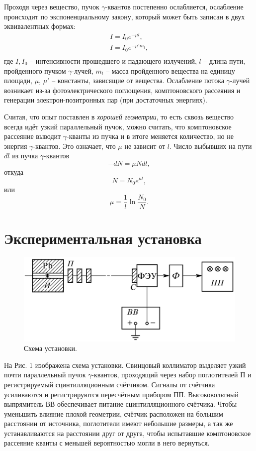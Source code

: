 \documentclass[a4paper,12pt]{article} %
\begin{document}
		Проходя через вещество, пучок $\gamma$-квантов постепенно ослабляется, ослабление происходит по экспоненциальному закону, который может быть записан в двух эквивалентных формах:
		\[\begin{array}{l}
			I = I_0 e^{-\mu l} ,\\
			I = I_0 e^{-\mu' m_l},\\
		\end{array}\]
		где $I, I_0$ -- интенсивности прошедшего и падающего излучений, $l$ -- длина пути, пройденного пучком $\gamma$-лучей, $m_l$ -- масса пройденного вещества на единицу площади, $\mu$, $\mu'$ -- константы, зависящие от вещества. 
		Ослабление потока $\gamma$-лучей возникает из-за фотоэлектрического поглощения, комптоновского рассеяния и генерации электрон-позитронных пар (при достаточных энергиях).\par
		Считая, что опыт поставлен в \textit{хорошей геометрии}, то есть сквозь вещество всегда идёт узкий параллельный пучок, можно считать, что комптоновское рассеяние выводит $\gamma$-кванты из пучка и в итоге меняется количество, но не энергия $\gamma$-квантов. 
		Это означает, что $\mu$ не зависит от $l$. 
		Число выбывших на пути $dl$ из пучка $\gamma$-квантов
		\[-dN = \mu N dl,\]
		откуда
		\[N = N_0 e^{\mu l},\]
		или
		\begin{equation}
			\mu = \dfrac{1}{l} \ln \dfrac{N_0}{N}.
		\end{equation}
	\newpage

	\section{Экспериментальная установка}

		\begin{figure}[h]
			\includegraphics[scale=0.5]{img/1.png}
			\centering
			\caption{Схема установки.}
		\end{figure}
		На Рис. 1 изображена схема установки.
		Свинцовый коллиматор выделяет узкий почти параллельный пучок $\gamma$-квантов, проходящий через набор поглотителей П и регистрируемый сцинтилляционным счётчиком. 
		Сигналы от счётчика усиливаются и регистрируются пересчётным прибором ПП. 
		Высоковольтный выпрямитель ВВ обеспечивает питание сцинтилляционного счётчика. 
		Чтобы уменьшить влияние плохой геометрии, счётчик расположен на большим расстоянии от источника, поглотители имеют небольшие размеры, а так же устанавливаются на расстоянии друг от друга, чтобы испытавшие комптоновское рассеяние кванты с меньшей вероятностью могли в него вернуться.
	
\end{document}
